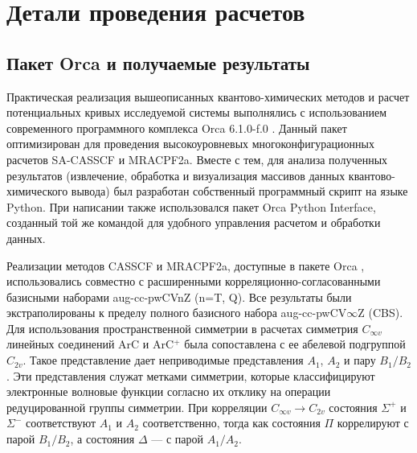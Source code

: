 \documentclass[12pt]{extarticle}
\begin{document}
	
	
	
	\section{Детали проведения расчетов}
	
	    \subsection{Пакет Orca и получаемые результаты}
	\label{sec:Chapter1.4}
	
	Практическая реализация вышеописанных квантово-химических методов и расчет потенциальных кривых исследуемой системы выполнялись с использованием современного программного комплекса Orca 6.1.0-f.0 \cite{neese_orca}. Данный пакет оптимизирован для проведения высокоуровневых многоконфигурационных расчетов SA-CASSCF и MRACPF2a. Вместе с тем, для анализа полученных результатов (извлечение, обработка и визуализация массивов данных квантово-химического вывода) был разработан собственный программный скрипт на языке Python. При написании также использовался пакет Orca Python Interface, созданный той же командой для удобного управления расчетом и обработки данных.
	
	Реализации методов CASSCF и MRACPF2a, доступные в пакете Orca \cite{neese_orca}, использовались совместно с расширенными корреляционно-согласованными базисными наборами aug-cc-pwCVnZ (n=T, Q). Все результаты были экстраполированы к пределу полного базисного набора aug-cc-pwCV$\infty$Z (CBS). Для использования пространственной симметрии в расчетах симметрия $C_{\infty v}$ линейных соединений ArC и ArC$^+$ была сопоставлена с ее абелевой подгруппой $C_{2 v}$. Такое представление дает неприводимые представления $A_1$, $A_2$ и пару $B_1 / B_2$. Эти представления служат метками симметрии, которые классифицируют электронные волновые функции согласно их отклику на операции редуцированной группы симметрии. При корреляции $C_{\infty v} \to C_{2 v}$ состояния $\Sigma^+$ и $\Sigma^-$ соответствуют $A_1$ и $A_2$ соответственно, тогда как состояния $\Pi$ коррелируют с парой $B_1/B_2$, а состояния $\Delta$ — с парой $A_1/A_2$.
	
\end{document}
